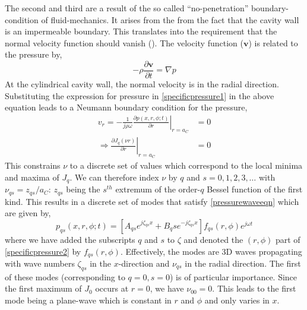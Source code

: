 The second and third are a result of the so called ``no-penetration'' boundary-condition
of fluid-mechanics. It arises from the from the fact that the cavity wall is an impermeable boundary. This translates 
into the requirement that the normal velocity function should vanish (\cite[p.~111]{pozrikidisFluid}).
The velocity function ($\mathbf{v}$) is related to the pressure by, 
\begin{equation}\label{pressurevelocityrelation}
 -\rho\frac{\partial \mathbf{v}}{\partial t}=\nabla p
\end{equation}
At the cylindrical cavity wall, the normal velocity is in the radial direction.
Substituting the expression for pressure in \eqref{specificpressure1} in the above equation leads to
a Neumann boundary condition for the pressure,
\begin{align}\label{radialnopenetration}
 v_r=-\left.\frac{1}{j\rho\omega}\frac{\partial p(x,r,\phi;t)}{\partial r}\right\vert_{r=a_C}&=0\nonumber\\
    \Rightarrow\left.\frac{\partial J_q (\nu r)}{\partial r}\right\vert_{r=a_C}&=0
\end{align}
This constrains $\nu$ to a discrete set of values which correspond to the local minima and maxima
of $J_q$. We can therefore index $\nu$ by $q$ and $s=0,1,2,3,\ldots$ with $\nu_{qs}=z_{qs}/a_C$:
$z_{qs}$ being the $s^{th}$ extremum of the order-$q$ Bessel function of the first kind.
This results in a discrete set of modes that satisfy \eqref{pressurewaveeqn} which are given
by,
\begin{equation}\label{specificpressure3}
 p_{qs}(x,r,\phi;t)=\left[A_{qs}e^{j\zeta_{qs}x}+B_q{s}e^{-j\zeta_{qs}x}\right]f_{qs}(r,\phi)e^{j\omega t}
\end{equation}
where we have added the subscripts $q$ and $s$ to $\zeta$ and denoted the $(r,\phi)$ part of \eqref{specificpressure2}
by $f_{qs}(r,\phi)$. Effectively, the
modes are 3D waves propagating with wave numbers $\zeta_{qs}$ in the $x$-direction and $\nu_{qs}$ in the radial
direction. The first of these modes (corresponding to $q=0,s=0$) is of particular importance. Since the first
maximum of $J_0$ occurs at $r=0$, we have $\nu_{00}=0$. This leads to the first mode being a plane-wave which
is constant in $r$ and $\phi$ and only varies in $x$. 

